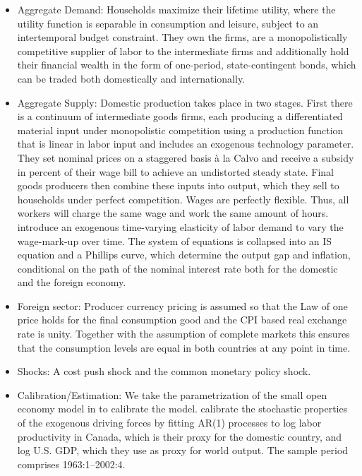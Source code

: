 \documentclass[11pt,a4paper]{article}
\begin{document}
	\begin{itemize}
		\item Aggregate Demand: Households maximize their lifetime utility, where the utility function is separable in consumption and leisure, subject to an intertemporal budget constraint. They own the firms, are a monopolistically competitive supplier of labor to the intermediate firms and additionally hold their financial wealth in the form of one-period, state-contingent bonds, which can be traded both domestically and internationally.
		\item Aggregate Supply: Domestic production takes place in two stages. First there is a continuum of intermediate goods firms, each producing a differentiated material input under monopolistic competition using a production function that is linear in labor input and includes an exogenous technology parameter. They set nominal prices on a staggered basis \`{a} la Calvo and receive a subsidy in percent of their wage bill to achieve an undistorted steady state. Final goods producers then combine these inputs into output, which they sell to households under perfect competition. Wages are perfectly flexible. Thus, all workers will charge the same wage and work the same amount of hours. \cite{ClaridaGaliGertler2002} introduce an exogenous time-varying elasticity of labor demand to vary the wage-mark-up over time. The system of equations is collapsed into an IS equation and a Phillips curve, which determine the output gap and inflation, conditional on the path of the nominal interest rate both for the domestic and the foreign economy.
		\item Foreign sector:
		Producer currency pricing is assumed so that the Law of one price holds for the final consumption good and the CPI based real exchange rate is unity. Together with the assumption of complete markets this ensures that the consumption levels are equal in both countries at any point in time.
		\item Shocks: A cost push shock and the common monetary policy shock.
		\item Calibration/Estimation: We take the parametrization of the small open economy model in \cite{GaliMonacelli2005} to calibrate the model. \cite{GaliMonacelli2005} calibrate the stochastic properties of the exogenous driving forces by fitting AR(1)
		processes to log labor productivity in Canada, which is their proxy for the domestic country, and log
		U.S. GDP, which they use as proxy for world output. The sample period comprises 1963:1--2002:4.
	\end{itemize}
	
\end{document}
